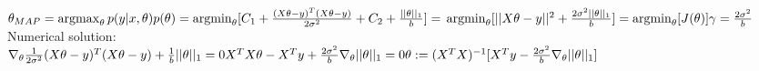\begin{answer}
$
\theta_{MAP} =  \operatorname*{argmax}_\theta  p(y|x, \theta)p(\theta)  = \operatorname*{argmin}_\theta [C_1 + \frac{(X\theta - y)^T(X\theta - y)}{2\sigma^2} + C_2 + \frac{||\theta||_1}{b}] = \\ 
\operatorname*{argmin}_\theta [||X\theta - y||^2+ \frac{2\sigma^2||\theta||_1}{b}]  = \operatorname*{argmin}_\theta [J(\theta)] \\
\gamma = \frac{2\sigma^2}{b} $\\ 
Numerical solution: \\
$
\nabla_\theta \frac{1}{2\sigma^2} (X\theta - y)^T (X\theta - y) +  \frac{1}{b} ||\theta||_1  =  0 \\
X^TX\theta - X^T y + \frac{2\sigma^2}{b}  \nabla_\theta ||\theta||_1   = 0 \\
\theta := (X^TX)^{-1}[X^Ty - \frac{2\sigma^2}{b}  \nabla_\theta ||\theta||_1 ]
$
\end{answer}
